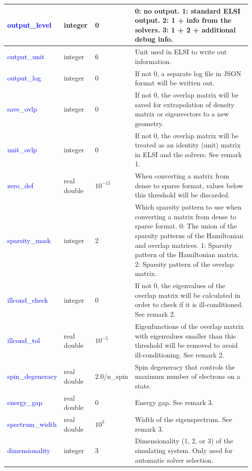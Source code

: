 \documentclass{report}
\newcommand{\tcb}[1]{\textcolor{blue}{#1}}
\begin{document}
\begin{longtable}[]{|p{30mm}|p{20mm}|p{15mm}|p{100mm}|}
\hline
\tcb{output\_level}       & integer     & 0           & 0: no output. 1: standard ELSI output. 2: 1 + info from the solvers. 3: 1 + 2 + additional debug info.\\
\hline
\tcb{output\_unit}        & integer     & 6           & Unit used in ELSI to write out information.\\
\hline
\tcb{output\_log}         & integer     & 0           & If not 0, a separate log file in JSON format will be written out.\\
\hline
\tcb{save\_ovlp}          & integer     & 0           & If not 0, the overlap matrix will be saved for extrapolation of density matrix or eigenvectors to a new geometry.\\
\hline
\tcb{unit\_ovlp}          & integer     & 0           & If not 0, the overlap matrix will be treated as an identity (unit) matrix in ELSI and the solvers. See remark 1.\\
\hline
\tcb{zero\_def}           & real double & $10^{-15}$  & When converting a matrix from dense to sparse format, values below this threshold will be discarded.\\
\hline
\tcb{sparsity\_mask}      & integer     & 2           & Which sparsity pattern to use when converting a matrix from dense to sparse format. 0: The union of the sparsity patterns of the Hamiltonian and overlap matrices. 1: Sparsity pattern of the Hamiltonian matrix. 2: Sparsity pattern of the overlap matrix.\\
\hline
\tcb{illcond\_check}      & integer     & 0           & If not 0, the eigenvalues of the overlap matrix will be calculated in order to check if it is ill-conditioned. See remark 2.\\
\hline
\tcb{illcond\_tol}        & real double & $10^{-5}$   & Eigenfunctions of the overlap matrix with eigenvalues smaller than this threshold will be removed to avoid ill-conditioning. See remark 2.\\
\hline
\tcb{spin\_degeneracy}    & real double & 2.0/n\_spin & Spin degeneracy that controls the maximum number of electrons on a state.\\
\hline
\tcb{energy\_gap}         & real double & 0           & Energy gap. See remark 3.\\
\hline
\tcb{spectrum\_width}     & real double & $10^{3}$    & Width of the eigenspectrum. See remark 3.\\
\hline
\tcb{dimensionality}      & integer     & 3           & Dimensionality (1, 2, or 3) of the simulating system. Only used for automatic solver selection.\\

\end{longtable}
\end{document}
